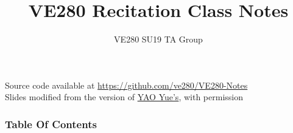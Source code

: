\documentclass[slidestop,compress,mathserif]{beamer}
\title{VE280 Recitation Class Notes}
\author{VE280 SU19 TA Group}
\institute{UM-SJTU Joint Institute}
\begin{document}
	\begin{frame} %
	\titlepage
	
	\tiny{Source code available at \url{https://github.com/ve280/VE280-Notes}\\
	Slides modified from the version of \href{https://github.com/tripack45/VE280-Notes}{YAO Yue's}, with permission}
	\end{frame}
	
	\begin{frame}[allowframebreaks]
		\small
		\frametitle{Table Of Contents}
		\tableofcontents
	\end{frame}

	
	
\end{document}
